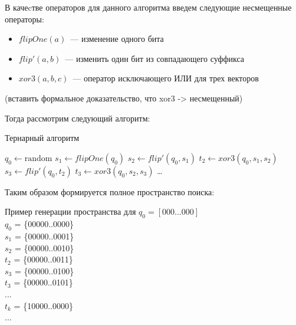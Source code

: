 \label{ternary}


В качеcтве операторов для данного алгоритма введем следующие несмещенные операторы: 
\begin{itemize}
   \item $flipOne(a)$~--- изменение одного бита
   \item $flip'(a, b)$~--- изменить один бит из совпадающего суффикса
   \item $xor3(a,b,c)$~--- оператор исключающего ИЛИ для трех векторов 
\end{itemize}

(вставить формальное доказательство, что xor3 -> несмещенный)

Тогда рассмотрим следующий алгоритм: 
\begin{algorithm}[H]
\caption{Тернарный алгоритм}\label{lst1}
\begin{algorithmic}
        \State $q_0 \leftarrow \textrm{random}$
        \State $s_1 \leftarrow flipOne(q_0)$
	        \State $s_2 \leftarrow flip'(q_0, s_1)$
            \State $t_2 \leftarrow xor3(q_0,s_1,s_2)$
            \State $s_3 \leftarrow flip'(q_0, t_2)$
            \State $t_3 \leftarrow xor3(q_0,s_2,s_3)$
            \State \ldots
		\EndWhile
\end{algorithmic}
\end{algorithm}

Таким образом формируется полное пространство поиска: 
\begin{example}
Пример генерации пространства для $q_0 = [000...000]$  \\
    $q_0$ = \{00000..0000\} \\
    $s_1$ = \{00000..0001\} \\
    $s_2$ = \{00000..0010\} \\
    $t_2$ = \{00000..0011\} \\
    $s_3$ = \{00000..0100\} \\
    $t_3$ = \{00000..0101\} \\
    ... \\
    $t_k$ = \{10000..0000\} \\
    ... \\
\end{example}

